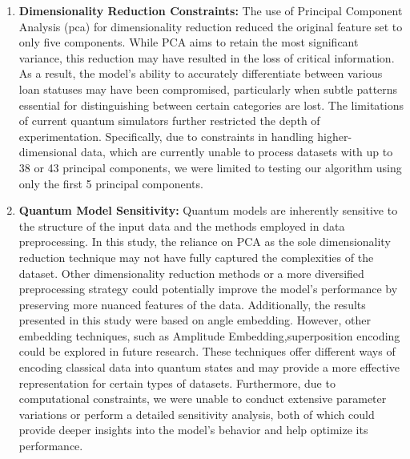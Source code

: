 \documentclass[a4paper]{article}
\begin{document}
\begin{enumerate}
	\item[] \textbf{Dimensionality Reduction Constraints:} The use of Principal Component Analysis  (\gls{pca}) for dimensionality reduction reduced the original feature set to only five components. While PCA aims to retain the most significant variance, this reduction may have resulted in the loss of critical information. As a result, the model’s ability to accurately differentiate between various loan statuses may have been compromised, particularly when subtle patterns essential for distinguishing between certain categories are lost. The limitations of current quantum simulators further restricted the depth of experimentation. Specifically, due to constraints in handling higher-dimensional data, which are currently unable to process datasets with up to 38 or 43 principal components, we were limited to testing our algorithm using only the first 5 principal components.  
	
	\item[] \textbf{Quantum Model Sensitivity:} Quantum models are inherently sensitive to the structure of the input data and the methods employed in data preprocessing. In this study, the reliance on PCA as the sole dimensionality reduction technique may not have fully captured the complexities of the dataset. Other dimensionality reduction methods or a more diversified preprocessing strategy could potentially improve the model’s performance by preserving more nuanced features of the data. Additionally, the results presented in this study were based on angle embedding. However, other embedding techniques, such as Amplitude Embedding,superposition encoding could be explored in future research. These techniques offer different ways of encoding classical data into quantum states and may provide a more effective representation for certain types of datasets. Furthermore, due to computational constraints, we were unable to conduct extensive parameter variations or perform a detailed sensitivity analysis, both of which could provide deeper insights into the model's behavior and help optimize its performance.
	

\end{enumerate}
\end{document}
